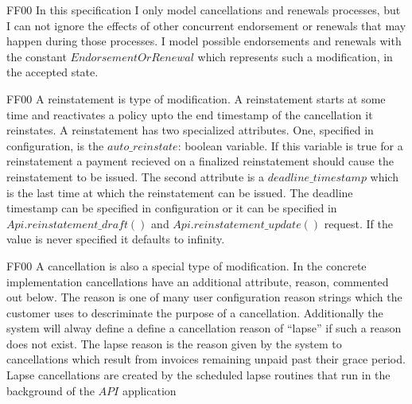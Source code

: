 \tlatex
{}
\@x{}\moduleLeftDash{}\moduleRightDash\@xx{}%
%
\begin{lcom}{7.5}%
\begin{cpar}{0}{F}{F}{0}{0}{}%
 In this specification I only model cancellations and renewals processes, but
 I can not
 ignore the effects of other concurrent endorsement or renewals that may
 happen during
 those processes. I model possible endorsements and renewals with the constant
 \ensuremath{EndorsementOrRenewal} which represents such a modification, in
 the accepted state.
\end{cpar}%
\end{lcom}%
%
\@pvspace{8.0pt}%
\begin{lcom}{7.5}%
\begin{cpar}{0}{F}{F}{0}{0}{}%
A reinstatement is type of modification. A reinstatement starts at some time
 and reactivates a policy upto the end timestamp of the cancellation it
 reinstates. A
 reinstatement has two specialized attributes. One, specified in
 configuration, is the
 \ensuremath{auto\_reinstate}: boolean variable. If this variable is true for
 a reinstatement a payment
 recieved on a finalized reinstatement should cause the reinstatement to be
 issued. The
 second attribute is a \ensuremath{deadline\_timestamp} which is the last
 time at which the reinstatement
 can be issued. The deadline timestamp can be specified in configuration or
 it can be
 specified in \ensuremath{Api.reinstatement\_draft()} and
 \ensuremath{Api.reinstatement\_update()} request. If the
 value is never specified it defaults to infinity.
\end{cpar}%
\end{lcom}%
\@x{ Reinstatements \.{\defeq} [}%
%
%
%
%
%
%
%
\@x{ ]}%
\@pvspace{8.0pt}%
\begin{lcom}{7.5}%
\begin{cpar}{0}{F}{F}{0}{0}{}%
 A cancellation is also a special type of modification. In the concrete
 implementation
 cancellations have an additional attribute, reason, commented out below. The
 reason is
 one of many user configuration reason strings which the customer uses to
 descriminate
 the purpose of a cancellation. Additionally the system will alway define a
 define a
 cancellation reason of ``lapse'' if such a reason does not exist. The lapse
 reason is
 the reason given by the system to cancellations which result from invoices
 remaining
 unpaid past their grace period. Lapse cancellations are created by the
 scheduled
 lapse routines that run in the background of the \ensuremath{API} application
\end{cpar}%
\end{lcom}%
